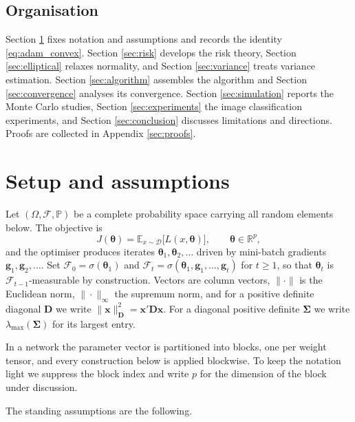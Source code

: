 \documentclass[pdflatex,sn-mathphys-num]{sn-jnl}%
\theoremstyle{thmstyleone}%
\theoremstyle{thmstyletwo}%
\theoremstyle{thmstylethree}%
\newcommand{\E}{\mathbb{E}}
\newcommand{\Real}{\mathbb{R}}
\begin{document}
\subsection{Organisation}

Section \ref{sec:setup} fixes notation and assumptions and records the identity \eqref{eq:adam_convex}. Section \ref{sec:risk} develops the risk theory, Section \ref{sec:elliptical} relaxes normality, and Section \ref{sec:variance} treats variance estimation. Section \ref{sec:algorithm} assembles the algorithm and Section \ref{sec:convergence} analyses its convergence. Section \ref{sec:simulation} reports the Monte Carlo studies, Section \ref{sec:experiments} the image classification experiments, and Section \ref{sec:conclusion} discusses limitations and directions. Proofs are collected in Appendix \ref{sec:proofs}.

\section{Setup and assumptions}
\label{sec:setup}

Let $(\Omega,\mathcal F,\mathbb P)$ be a complete probability space carrying all random elements below. The objective is
\begin{equation}
J(\bm\theta)=\E_{x\sim\mathcal D}\bigl[L(x,\bm\theta)\bigr],
\qquad
\bm\theta\in\Real^{p},
\end{equation}
and the optimiser produces iterates $\bm\theta_1,\bm\theta_2,\dots$ driven by mini-batch gradients $\bm g_1,\bm g_2,\dots$. Set $\mathcal F_0=\sigma(\bm\theta_1)$ and $\mathcal F_t=\sigma(\bm\theta_1,\bm g_1,\dots,\bm g_t)$ for $t\ge1$, so that $\bm\theta_t$ is $\mathcal F_{t-1}$-measurable by construction. Vectors are column vectors, $\|\cdot\|$ is the Euclidean norm, $\|\cdot\|_\infty$ the supremum norm, and for a positive definite diagonal $\bm D$ we write $\|\bm x\|^2_{\bm D}=\bm x'\bm D\bm x$. For a diagonal positive definite $\bm\Sigma$ we write $\lambda_{\max}(\bm\Sigma)$ for its largest entry.

In a network the parameter vector is partitioned into blocks, one per weight tensor, and every construction below is applied blockwise. To keep the notation light we suppress the block index and write $p$ for the dimension of the block under discussion.

The standing assumptions are the following.
\end{document}
